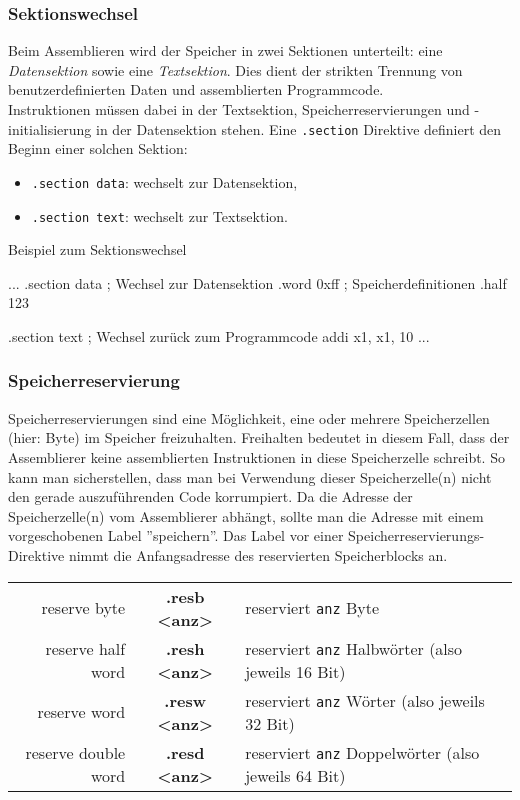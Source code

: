 \subsubsection{Sektionswechsel}

Beim Assemblieren wird der Speicher in zwei Sektionen unterteilt: eine
\emph{Datensektion} sowie eine \emph{Textsektion}. Dies dient der strikten
Trennung von benutzerdefinierten Daten und assemblierten Programmcode.\\

Instruktionen müssen dabei in der Textsektion, Speicherreservierungen und
-initialisierung in der Datensektion stehen. Eine \texttt{.section} Direktive
definiert den Beginn einer solchen Sektion:

\begin{itemize}
  \item \texttt{.section data}: wechselt zur Datensektion,
  \item \texttt{.section text}: wechselt zur Textsektion.
\end{itemize}

\begin{exampleblock}{Beispiel zum Sektionswechsel}
	\begin{riscv}
	...
	.section data ; Wechsel zur Datensektion
	.word 0xff ; Speicherdefinitionen
	.half 123

	.section text ; Wechsel zurück zum Programmcode
	addi x1, x1, 10
	...
  \end{riscv}
\end{exampleblock}

\subsubsection{Speicherreservierung}
Speicherreservierungen sind eine Möglichkeit, eine oder mehrere Speicherzellen
(hier: Byte) im Speicher freizuhalten. Freihalten bedeutet in diesem Fall, dass der
Assemblierer keine assemblierten Instruktionen in diese Speicherzelle schreibt.
So kann man sicherstellen, dass man bei Verwendung dieser Speicherzelle(n) nicht
den gerade auszuführenden Code korrumpiert. Da die Adresse der Speicherzelle(n)
vom Assemblierer abhängt, sollte man die Adresse mit einem vorgeschobenen Label
''speichern''. Das Label vor einer Speicherreservierungs-Direktive nimmt die
Anfangsadresse des reservierten Speicherblocks an.\\

\begin{centering}
	\begin{tabular}{rcl}
		reserve byte & \textbf{.resb <anz>} & reserviert \texttt{anz} Byte\\
		reserve half word & \textbf{.resh <anz>} & reserviert \texttt{anz} Halbwörter (also jeweils 16 Bit)\\
		reserve word & \textbf{.resw <anz>} & reserviert \texttt{anz} Wörter (also jeweils 32 Bit)\\
		reserve double word & \textbf{.resd <anz>} & reserviert \texttt{anz} Doppelwörter (also jeweils 64 Bit)\\
	\end{tabular}
\end{centering}

